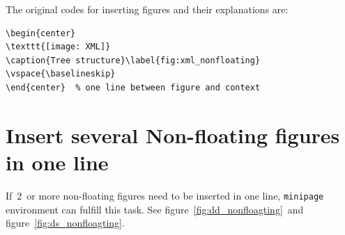 The original codes for inserting figures and their explanations are:

\begin{lstlisting}[language={[LaTeX]TeX}]
\begin{center}
\texttt{[image: XML]}
\caption{Tree structure}\label{fig:xml_nonfloating}
\vspace{\baselineskip}
\end{center}  % one line between figure and context
\end{lstlisting}

\section{Insert several Non-floating figures in one line}
If~2~or more non-floating figures need to be inserted in one line, \verb|minipage| environment can fulfill this task. See figure~\ref{fig:dd_nonfloagting}~and figure~\ref{fig:ds_nonfloagting}.

